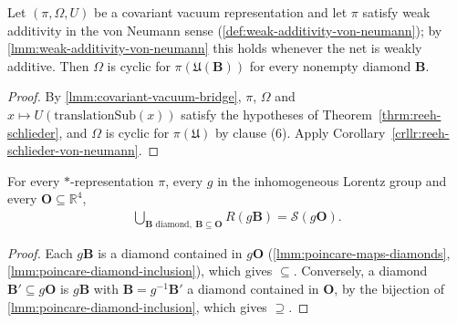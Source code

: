 \begin{corollary}
    \label{crllr:covariant-vacuum-reeh-schlieder}
    \leanok
    Let $(\pi, \Omega, U)$ be a covariant vacuum representation and let $\pi$ satisfy weak additivity in the von Neumann sense (\ref{def:weak-additivity-von-neumann}); by \ref{lmm:weak-additivity-von-neumann} this holds whenever the net is weakly additive. Then $\Omega$ is cyclic for $\pi(\mathfrak{U}(\mathbf{B}))$ for every nonempty diamond $\mathbf{B}$.
\end{corollary}
\begin{proof}
    \leanok
    By \ref{lmm:covariant-vacuum-bridge}, $\pi$, $\Omega$ and $x \mapsto U(\mathrm{translationSub}(x))$ satisfy the hypotheses of Theorem~\ref{thrm:reeh-schlieder}, and $\Omega$ is cyclic for $\pi(\mathfrak{U})$ by clause (6). Apply Corollary~\ref{crllr:reeh-schlieder-von-neumann}.
\end{proof}

\begin{lemma}
    \label{lmm:region-generating-set-reindex}
    \leanok
    For every $*$-representation $\pi$, every $g$ in the inhomogeneous Lorentz group and every $\mathbf{O} \subseteq \mathbb{R}^4$,
    \begin{align}
        \bigcup_{\mathbf{B} \text{ diamond},\ \mathbf{B} \subseteq \mathbf{O}} R(g\mathbf{B}) = \mathcal{S}(g\mathbf{O}).
    \end{align}
\end{lemma}
\begin{proof}
    \leanok
    Each $g\mathbf{B}$ is a diamond contained in $g\mathbf{O}$ (\ref{lmm:poincare-maps-diamonds}, \ref{lmm:poincare-diamond-inclusion}), which gives $\subseteq$. Conversely, a diamond $\mathbf{B}' \subseteq g\mathbf{O}$ is $g\mathbf{B}$ with $\mathbf{B} = g^{-1}\mathbf{B}'$ a diamond contained in $\mathbf{O}$, by the bijection of \ref{lmm:poincare-diamond-inclusion}, which gives $\supseteq$.
\end{proof}

